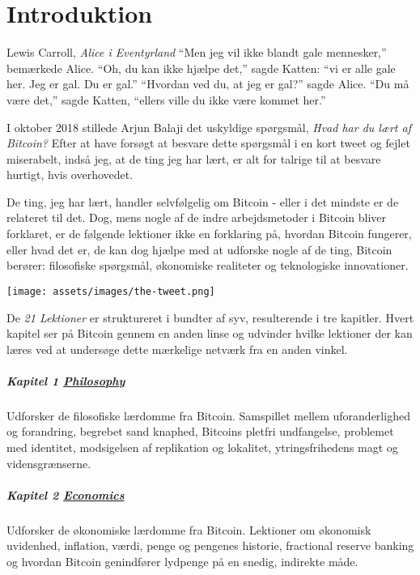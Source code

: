 \chapter*{Introduktion}
\label{ch:introduktion}

\begin{chapquote}{Lewis Carroll, \textit{Alice i Eventyrland}}
\enquote{Men jeg vil ikke blandt gale mennesker,} bemærkede Alice. 
\enquote{Oh, du kan ikke hjælpe det,} sagde Katten: \enquote{vi er alle gale 
her. Jeg er gal. Du er gal.} \enquote{Hvordan ved du, at jeg er gal?} sagde 
Alice. \enquote{Du må være det,} sagde Katten, \enquote{ellers ville du ikke
være kommet her.}
\end{chapquote}

I oktober 2018 stillede Arjun Balaji det uskyldige spørgsmål,
\textit{Hvad har du lært af Bitcoin?} Efter at have forsøgt at besvare dette
spørgsmål i en kort tweet og fejlet miserabelt, indså jeg, at de ting
jeg har lært, er alt for talrige til at besvare hurtigt, hvis overhovedet.

De ting, jeg har lært, handler selvfølgelig om Bitcoin - eller i det mindste 
er de relateret til det. Dog, mens nogle af de indre arbejdsmetoder i Bitcoin 
bliver forklaret, er de følgende lektioner ikke en forklaring på, hvordan 
Bitcoin fungerer, eller hvad det er, de kan dog hjælpe med at udforske nogle 
af de ting, Bitcoin berører: filosofiske spørgsmål, økonomiske realiteter og 
teknologiske innovationer.

\begin{center}
  \texttt{[image: assets/images/the-tweet.png]}
\end{center}

De \textit{21 Lektioner} er struktureret i bundter af syv, resulterende i tre
kapitler. Hvert kapitel ser på Bitcoin gennem en anden linse og udvinder
hvilke lektioner der kan læres ved at undersøge dette mærkelige netværk fra en 
anden vinkel.

\paragraph{Kapitel 1 \hyperref[ch:philosophy]{Philosophy}} 
Udforsker de filosofiske lærdomme fra Bitcoin. Samspillet mellem 
uforanderlighed og forandring, begrebet sand knaphed, Bitcoins pletfri 
undfangelse, problemet med identitet, modsigelsen af replikation og lokalitet, 
ytringsfrihedens magt og vidensgrænserne.

\paragraph{Kapitel 2 \hyperref[ch:economics]{Economics}}
Udforsker de økonomiske lærdomme fra Bitcoin. Lektioner om økonomisk uvidenhed, 
inflation, værdi, penge og pengenes historie, fractional reserve banking og 
hvordan Bitcoin genindfører lydpenge på en snedig, indirekte måde.

